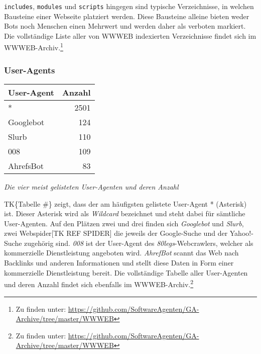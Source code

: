 \texttt{includes}, \texttt{modules} und \texttt{scripts} hingegen sind typische
Verzeichnisse, in welchen Bausteine einer Webseite platziert werden. Diese
Bausteine alleine bieten weder Bots noch Menschen einen Mehrwert und werden
daher als verboten markiert. Die vollständige Liste aller von WWWEB indexierten
Verzeichnisse findet sich im WWWEB-Archiv.\footnote{Zu finden unter:
\url{https://github.com/SoftwareAgenten/GA-Archive/tree/master/WWWEB}}

\subsubsection{User-Agents}
\label{ssub:user-agents}

\begin{tabular}{ l|r }
  \textbf{User-Agent} & \textbf{Anzahl}\\
  \hline
  *         & 2501\\
  Googlebot & 124\\
  Slurb     & 110\\
  008       & 109\\
  AhrefsBot & 83\\
\end{tabular}

\emph{Die vier meist gelisteten User-Agenten und deren Anzahl}

TK\{Tabelle \#\} zeigt, dass der am häufigsten gelistete User-Agent *
(Asterisk) ist. Dieser Asterisk wird als \emph{Wildcard} bezeichnet und steht
dabei für sämtliche User-Agenten. Auf den Plätzen zwei und drei finden sich
\emph{Googlebot} und \emph{Slurb}, zwei Webspider{[}TK REF SPIDER{]} die
jeweils der Google-Suche und der Yahoo!-Suche zugehörig sind. \emph{008} ist
der User-Agent des \emph{80legs}-Webcrawlers, welcher als kommerzielle
Dienstleistung angeboten wird. \emph{AhrefBot} scannt das Web nach Backlinks
und anderen Informationen und stellt diese Daten in Form einer kommerzielle
Dienstleistung bereit. Die vollständige Tabelle aller User-Agenten und deren
Anzahl findet sich ebenfalls im WWWEB-Archiv.\footnote{Zu finden unter:
\url{https://github.com/SoftwareAgenten/GA-Archive/tree/master/WWWEB}}

